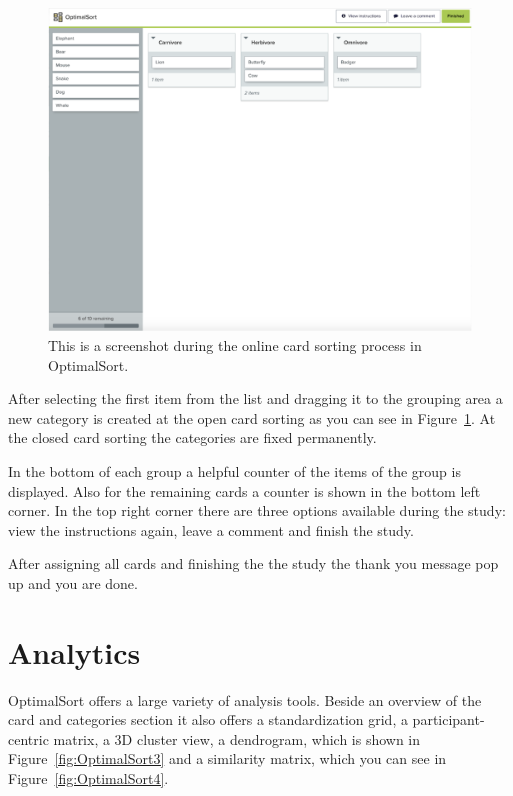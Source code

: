 \begin{figure}[tp] 
\centering
\includegraphics[keepaspectratio,width=\linewidth,height=\halfh]{images/optimalsort-sorting.png}
\caption[OptimalSort Card Sorting] { This is a screenshot during the online card
sorting process in OptimalSort.
 }
\label{fig:OptimalSort2}
\end{figure}



After selecting the first item from the list and dragging it to the
grouping area a new category is created at the open card sorting
as you can see in Figure~\ref{fig:OptimalSort2}. At the closed 
card sorting the categories are fixed permanently.

In the bottom of each group a helpful counter of the items of the
group is displayed. Also for the remaining cards a counter is shown in
the bottom left corner. In the top right corner there are three
options available during the study: view the instructions again, leave
a comment and finish the study.

After assigning all cards and finishing the the study the thank you
message pop up and you are done.



\section{Analytics}

OptimalSort offers a large variety of analysis tools. Beside an
overview of the card and categories section it also offers a
standardization grid, a participant-centric matrix, a 3D cluster view, 
a dendrogram, which is shown in Figure~\ref{fig:OptimalSort3} 
and a similarity matrix, which you can see in 
Figure~\ref{fig:OptimalSort4}.



